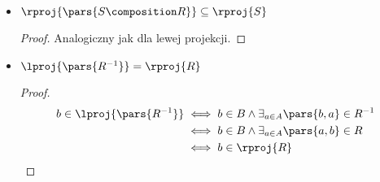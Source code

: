 \begin{description}
\begin{itemize}
\begin{proof}
\begin{equation*}
\begin{split}
                                \implies& a \in A \land \exists_{b \in B} \pars{a, b} \in R\\
                                \iff& a \in \lproj{R}
                        \end{split}
                    \end{equation*}
                    Warto zauważyć, że trzy z~powyższych przejść są tylko implikacjami (bo zapominamy na przykład o~pewnych członach koniunkcji) i~nie jest to przypadek. Istotnie, zachodzi tylko inkluzja w~podaną stronę. Aby się o~tym przekonać możemy przyjąć
                    \begin{align*}
                        A &= \set{a}\\
                        B &= \set{b}\\
                        C &= \set{c}\\
                        R &= \set{\pars{a, b}} \subseteq A \times B\\
                        S &= \emptyset \subseteq B \times C
                    \end{align*}
                    Wtedy \(S \composition R = \emptyset\), zatem również \(\lproj{\pars{S \composition R}} = \emptyset\). Natomiast \(\lproj{R} = \set{a}\), więc istotnie zachodzi dowiedziona inkluzja (byłby przypał, gdyby było inaczej), ale nie ma równości.
                \end{proof}
            \item \(\rproj{\pars{S \composition R}} \subseteq \rproj{S}\)
                \begin{proof}
                    Analogiczny jak dla lewej projekcji.
                \end{proof}
            \item \(\lproj{\pars{R^{-1}}} = \rproj{R}\)
                \begin{proof}
                    \begin{equation*}
                        \begin{split}
                            b \in \lproj{\pars{R^{-1}}}
                                &\iff b \in B \land \exists_{a \in A}\pars{b, a} \in R^{-1}\\
                                &\iff b \in B \land \exists_{a \in A}\pars{a, b} \in R\\
                                &\iff b \in \rproj{R}
                        \end{split}
                    \end{equation*}

\end{proof}
\end{itemize}
\end{description}
